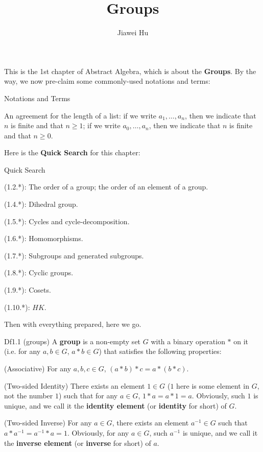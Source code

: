 \documentclass{article}
\title{\LARGE \textbf{Groups}}
\author{\large Jiawei Hu}
\begin{document}
\maketitle

This is the 1st chapter of Abstract Algebra, which is about the \textbf{Groups}. By the way, we now pre-claim some commonly-used notations and terms:
\begin{Df}{Notations and Terms}
    \begin{compactenum}
        \item An agreement for the length of a list: if we write $a_1, \dots, a_n$, then we indicate that $n$ is finite and that $n\geq 1$; if we write $a_0, \dots, a_n$, then we indicate that $n$ is finite and that $n\geq 0$.
    \end{compactenum}
\end{Df}

Here is the \textbf{Quick Search} for this chapter:
\begin{Th}{Quick Search}
    \begin{compactdesc}
        \item (1.2.*): The order of a group; the order of an element of a group.
        \item (1.4.*): Dihedral group.
        \item (1.5.*): Cycles and cycle-decomposition.
        \item (1.6.*): Homomorphisms.
        \item (1.7.*): Subgroups and generated subgroups.
        \item (1.8.*): Cyclic groups.
        \item (1.9.*): Cosets.
        \item (1.10.*): $HK$.
    \end{compactdesc}
\end{Th}

Then with everything prepared, here we go. 

\begin{Df}{Df1.1 (groups)}
    A \textbf{group} is a non-empty set $G$ with a binary operation $*$ on it (i.e. for any $a, b\in G$, $a*b\in G$) that satisfies the following properties:
    \begin{compactenum}
        \item (Associative) For any $a, b, c\in G$, $(a*b)*c=a*(b*c)$.
        \item (Two-sided Identity) There exists an element $1\in G$ ($1$ here is some element in $G$, not the number $1$) such that for any $a\in G$, $1*a=a*1=a$. \textcolor{Th}{Obviously, such $1$ is unique, } and we call it the \textbf{identity element} (or \textbf{identity} for short) of $G$.
        \item (Two-sided Inverse) For any $a\in G$, there exists an element $a^{-1}\in G$ such that $a*a^{-1}=a^{-1}*a=1$. \textcolor{Th}{Obviously, for any $a\in G$, such $a^{-1}$ is unique, } and we call it the \textbf{inverse element} (or \textbf{inverse} for short) of $a$. 
    \end{compactenum}
\end{Df}
\end{document}
